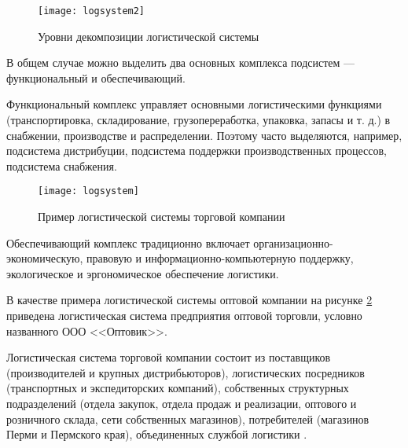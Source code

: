 \begin{figure}[h]
	\centering
	\texttt{[image: logsystem2]}
	\caption{Уровни декомпозиции логистической системы}
	\label{fig:logsystem2}
\end{figure}

В общем случае можно выделить два основных комплекса подсистем --- функциональный и обеспечивающий.

Функциональный комплекс управляет основными логистическими функциями (транспортировка, складирование, грузопереработка, упаковка, запасы и т. д.) в снабжении, производстве и распределении.
Поэтому часто выделяются, например, подсистема дистрибуции, подсистема поддержки производственных процессов, подсистема снабжения.

\begin{figure}[!h]
	\centering
	\texttt{[image: logsystem]}
	\caption{Пример логистической системы торговой компании}
	\label{fig:logsystem}
\end{figure}

Обеспечивающий комплекс традиционно включает организационно-экономическую, правовую и информационно-компьютерную поддержку, экологическое и эргономическое обеспечение логистики.

В качестве примера логистической системы оптовой компании на рисунке \ref{fig:logsystem} приведена логистическая система предприятия оптовой торговли, условно названного ООО <<Оптовик>>.

Логистическая система торговой компании состоит из поставщиков (производителей и крупных дистрибьюторов), логистических посредников (транспортных и экспедиторских компаний), собственных структурных подразделений (отдела закупок, отдела продаж и реализации, оптового и розничного склада, сети собственных магазинов), потребителей (магазинов Перми и Пермского края), объединенных службой логистики \cite[с. 27--30]{sergeev2}.



